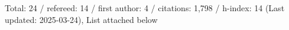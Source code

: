 Total: 24 / refereed: 14 / first author: 4 / citations: 1,798 / h-index: 14 (Last updated: 2025-03-24), List attached below